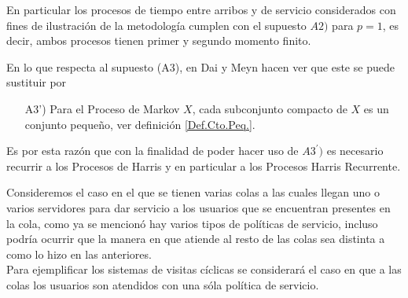 \documentclass{article}
\begin{document}
En particular los procesos de tiempo entre arribos y de servicio considerados con fines de ilustraci\'on de la metodolog\'ia cumplen con el supuesto $A2)$ para $p=1$, es decir, ambos procesos tienen primer y segundo momento finito.

En lo que respecta al supuesto (A3), en Dai y Meyn \cite{DaiSean} hacen ver que este se puede sustituir por
\begin{itemize}
\item[A3')] Para el Proceso de Markov $X$, cada subconjunto compacto de $X$ es un conjunto peque\~no, ver definici\'on
\ref{Def.Cto.Peq.}.
\end{itemize}

Es por esta raz\'on que con la finalidad de poder hacer uso de $A3^{'})$ es necesario recurrir a los Procesos de Harris y en particular a los Procesos Harris Recurrente.


Consideremos el caso en el que se tienen varias colas a las cuales llegan uno o varios servidores para dar servicio a los usuarios que se encuentran presentes en la cola, como ya se mencion\'o hay varios tipos de pol\'iticas de servicio, incluso podr\'ia ocurrir que la manera en que atiende al resto de las colas sea distinta a como lo hizo en las anteriores.\\

Para ejemplificar los sistemas de visitas c\'iclicas se considerar\'a el caso en que a las colas los usuarios son atendidos con una s\'ola pol\'itica de servicio.\\
\end{document}
